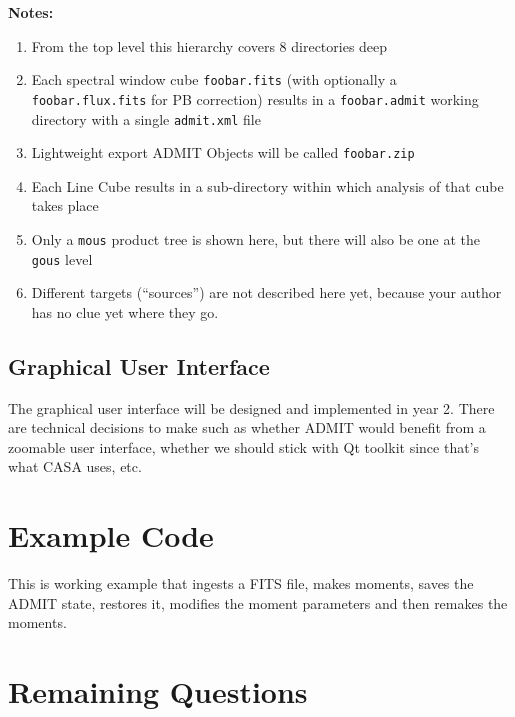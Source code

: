\documentclass[preprint]{aastex}
\begin{document}
\noindent
{\bf Notes:}

\begin{enumerate}

\item From the top level this hierarchy covers 8 directories deep

\item Each spectral window cube {\tt foobar.fits} (with optionally a {\tt foobar.flux.fits} for PB correction)
results in a {\tt foobar.admit} working directory with a single {\tt admit.xml} file

\item Lightweight export ADMIT Objects will be called {\tt foobar.zip}

\item Each Line Cube results in a sub-directory within which analysis of that cube takes place

\item Only a {\tt mous} product tree is shown here, but there will also be one at the {\tt gous} level

\item Different targets (``sources'') are not described here yet, because your author has no clue yet where they go. 
\end{enumerate}

\normalsize


\subsection{Graphical User Interface}

The graphical user interface will be designed and implemented in year
2. There are technical decisions to make such as whether ADMIT would
benefit from a zoomable user interface, whether we should stick with Qt
toolkit since that's what CASA uses, etc.


\appendix 

\section{Example Code}

This is working example that ingests a FITS file, makes moments, saves the
ADMIT state, restores it, modifies the moment parameters and then remakes 
the moments.


\section{Remaining Questions}
\end{document}
